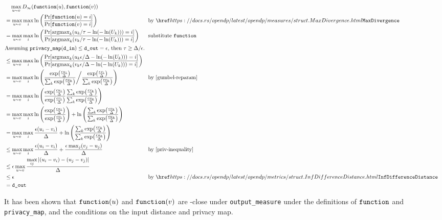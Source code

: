 \documentclass{article}
\begin{document}
\begin{align*}
    &\quad \max\limits_{u \sim v} D_\infty(\function(u), \function(v)) \\
    &= \max\limits_{u \sim v} \max\limits_{i} \ln\left(\frac{\Pr[\function(u) = i]}{\Pr[\function(v) = i]}\right) 
    &&\text{by } \rustdoc{measures/struct}{MaxDivergence}\\
    &= \max\limits_{u \sim v} \max\limits_{i} \ln\left(\frac
            {\Pr[\mathrm{argmax}_k (u_k / \tau - \ln(-\ln(U_k))) = i]}
            {\Pr[\mathrm{argmax}_k (v_k / \tau - \ln(-\ln(U_k))) = i]}
        \right) &&\text{substitute \function}\\
    \intertext{Assuming $\texttt{privacy\_map}(\din) \le \dout = \epsilon$, then $ \tau \geq \Delta / \epsilon$.}
    &\le \max\limits_{u \sim v} \max\limits_{i} \ln\left(\frac
            {\Pr[\mathrm{argmax}_k (u_k \epsilon / \Delta - \ln(-\ln(U_k))) = i]}
            {\Pr[\mathrm{argmax}_k (v_k \epsilon / \Delta - \ln(-\ln(U_k))) = i]}
        \right)\\
    &= \max\limits_{u \sim v} \max\limits_{i} \ln \left(
        \frac
            {\exp(\frac{\epsilon u_i}{\Delta})}
            {\sum_{k} \exp(\frac{\epsilon u_k}{\Delta})
        }
        \bigg/ \frac
            {\exp(\frac{\epsilon v_i}{\Delta})}
            {\sum_{k} \exp(\frac{\epsilon v_k}{\Delta})} \right)
        &&\text{by \ref{gumbel-reparam}} \\
    &= \max\limits_{u \sim v} \max\limits_{i} \ln \left(\frac
        {\exp(\frac{\epsilon u_i}{\Delta})}{\exp(\frac{\epsilon v_i}{\Delta})}
        \frac{\sum_{k} \exp(\frac{\epsilon v_k}{\Delta})}{\sum_{k} \exp(\frac{\epsilon u_k}{\Delta})}\right) \\
    &= \max\limits_{u \sim v} \max\limits_{i} \ln \left(\frac
        {\exp(\frac{\epsilon u_i}{\Delta})}{\exp(\frac{\epsilon v_i}{\Delta})}\right) + \ln \left(
        \frac{\sum_{k} \exp(\frac{\epsilon v_k}{\Delta})}{\sum_{k} \exp(\frac{\epsilon u_k}{\Delta})}\right) \\
    &= \max\limits_{u \sim v} \max\limits_{i} \frac{\epsilon (u_i - v_i)}{\Delta} 
        + \ln\left(\frac{\sum_{k} \exp(\frac{\epsilon v_k}{\Delta})}{\sum_{k} \exp(\frac{\epsilon u_k}{\Delta})}\right) \\
    &\leq \max\limits_{u \sim v} \max\limits_{i} \frac{\epsilon (u_i - v_i)}{\Delta} + \frac{\epsilon \max_j (v_j - u_j)}{\Delta} &&\text{by \ref{priv-inequality}} \\
    &\leq \epsilon \max\limits_{u \sim v} \frac{\max\limits_{ij} \abs{(u_i - v_i) - (u_j - v_j)}}{\Delta} \\
    &\leq \epsilon &&\text{by }\rustdoc{metrics/struct}{InfDifferenceDistance} \\
    &= \dout
\end{align*}    

It has been shown that $\texttt{function}(u)$ and $\texttt{function}(v)$ are \dout-close under \texttt{output\_measure} 
under the definitions of $\texttt{function}$ and \texttt{privacy\_map}, 
and the conditions on the input distance and privacy map.





\end{document}
